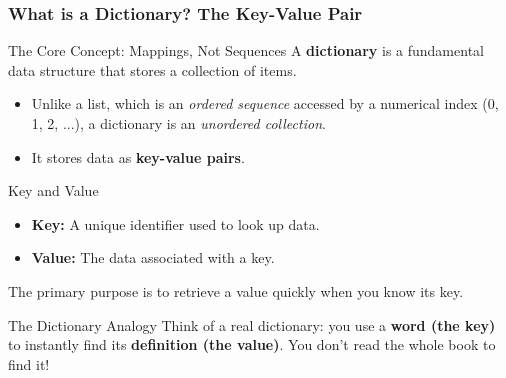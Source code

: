 \documentclass{beamer}
\begin{document}
\begin{frame}[fragile]
    \frametitle{What is a Dictionary? The Key-Value Pair}
    \begin{block}{The Core Concept: Mappings, Not Sequences}
        A \textbf{dictionary} is a fundamental data structure that stores a collection of items.
        \begin{itemize}
            \item Unlike a list, which is an \textit{ordered sequence} accessed by a numerical index (0, 1, 2, ...), a dictionary is an \textit{unordered collection}.
            \item It stores data as \textbf{key-value pairs}.
        \end{itemize}
    \end{block}

    \begin{alertblock}{Key and Value}
        \begin{itemize}
            \item \textbf{Key:} A unique identifier used to look up data.
            \item \textbf{Value:} The data associated with a key.
        \end{itemize}
        The primary purpose is to retrieve a value quickly when you know its key.
    \end{alertblock}

    \begin{exampleblock}{The Dictionary Analogy}
        Think of a real dictionary: you use a \textbf{word (the key)} to instantly find its \textbf{definition (the value)}. You don't read the whole book to find it!
    \end{exampleblock}
\end{frame}
\end{document}
